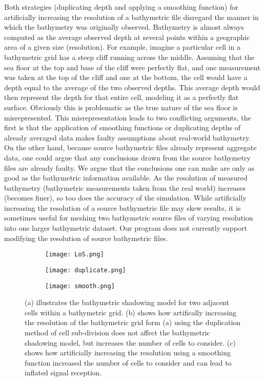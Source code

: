 Both strategies (duplicating depth and applying a smoothing function) for artificially increasing the resolution of a bathymetric file disregard the manner in which the bathymetry was originally observed.  Bathymetry is almost always computed as the average observed depth at several points within a geographic area of a given size (resolution).  For example, imagine a particular cell in a bathymetric grid has a steep cliff running across the middle.  Assuming that the sea floor at the top and base of the cliff were perfectly flat, and one measurement was taken at the top of the cliff and one at the bottom, the cell would have a depth equal to the average of the two observed depths.  This average depth would then represent the depth for that entire cell, modeling it as a perfectly flat surface.  Obviously this is problematic as the true nature of the sea floor is misrepresented.  This misrepresentation leads to two conflicting arguments, the first is that the application of smoothing functions or duplicating depths of already averaged data makes faulty assumptions about real-world bathymetry.  On the other hand, because source bathymetric files already represent aggregate data, one could argue that any conclusions drawn from the source bathymetry files are already faulty.  We argue that the conclusions one can make are only as good as the bathymetric information available.  As the resolution of measured bathymetry (bathymetric measurements taken from the real world) increases (becomes finer), so too does the accuracy of the simulation.  While artificially increasing the resolution of a source bathymetric file may skew results, it is sometimes useful for meshing two bathymetric source files of varying resolution into one larger bathymetric dataset.  Our program does not currently support modifying the resolution of source bathymetric files.


\begin{figure}[h]
	\label{resolutionScale}
	\begin{subfigure}{.5\textwidth}
		\centering
		\texttt{[image: LoS.png]}
		\caption{}
		\label{LoS}
	\end{subfigure}%
	\begin{subfigure}{.5\textwidth}
		\centering
		\texttt{[image: duplicate.png]}
		\caption{}
		\label{duplicate}
	\end{subfigure}
	\begin{subfigure}{.5\textwidth}
		\centering
		\texttt{[image: smooth.png]}
		\caption{}
		\label{smooth}
	\end{subfigure}
	
	\caption{(a) illustrates the bathymetric shadowing model for two adjacent cells within a bathymetric grid.  (b) shows how artifically increasing the resolution of the bathymetric grid form (a) using the duplication method of cell sub-division does not affect the bathymetric shadowing model, but increases the number of cells to consider.  (c) shows how artificially increasing the resolution using a smoothing function increased the number of cells to consider and can lead to inflated signal reception.}
\end{figure}


